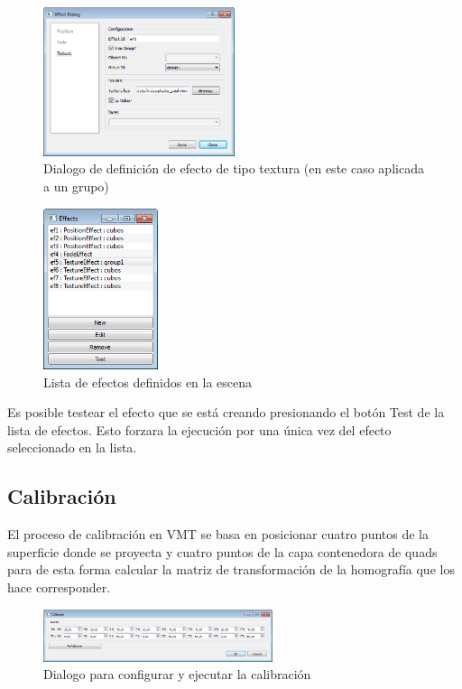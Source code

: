 \begin{figure}[H]
  \centering
    \includegraphics[width=0.5\textwidth]{./Cap5_vmt/vmt_EfectDialog3.png}
  \caption{Dialogo de definición de efecto de tipo textura (en este caso aplicada a un grupo)}
  \label{fig:VMT-EffectTexture}
\end{figure}

\begin{figure}[H]
  \centering
    \includegraphics[width=0.3\textwidth]{./Cap5_vmt/vmt_Efects.png}
  \caption{Lista de efectos definidos en la escena}
  \label{fig:VMT-EffectList}
\end{figure}

Es posible testear el efecto que se está creando presionando el botón Test de la lista de efectos. Esto forzara la ejecución por una única vez del efecto seleccionado en la lista.

\subsection{Calibración}

El proceso de calibración en VMT se basa en posicionar cuatro puntos de la superficie donde se proyecta y cuatro puntos de la capa contenedora de quads para de esta forma calcular la matriz de transformación de la homografía que los hace corresponder.

\begin{figure}[H]
  \centering
    \includegraphics[width=0.6\textwidth]{./Cap5_vmt/vmt_Calibrate.png}
  \caption{Dialogo para configurar y ejecutar la calibración}
  \label{fig:VMT-Calib}
\end{figure}

